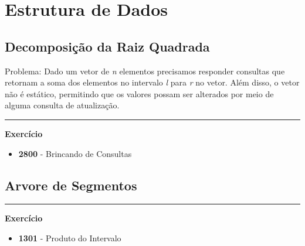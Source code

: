 \section{Estrutura de Dados}
\subsection{Decomposição da Raiz Quadrada}

Problema:
Dado um vetor de \textit{n} elementos precisamos responder consultas que retornam a soma dos elementos no intervalo \textit{l} para \textit{r} no vetor. Além disso, o vetor não é estático, permitindo que os valores possam ser alterados por meio de alguma consulta de atualização.


\vspace{1cm}
\rule{\textwidth}{0.4pt}
\large{\textbf{Exercício}}\\
\begin{itemize}
    \item \textbf{2800} - Brincando de Consultas
\end{itemize}


\newpage
\subsection{Arvore de Segmentos}

\vspace{1cm}
\rule{\textwidth}{0.4pt}
\large{\textbf{Exercício}}\\
\begin{itemize}
    \item \textbf{1301} - Produto do Intervalo
\end{itemize}

\newpage